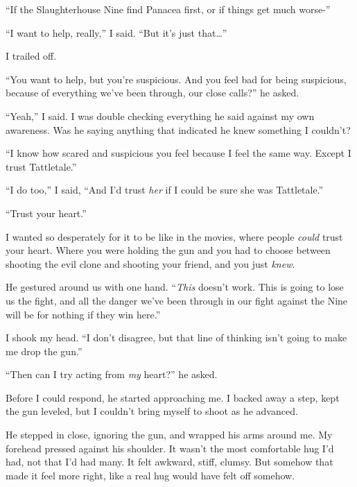 ``If the Slaughterhouse Nine find Panacea first, or if things get much worse-''



``I want to help, really,'' I said.  ``But it's just that\ldots''



I trailed off.



``You want to help, but you're suspicious.  And you feel bad for being suspicious, because of everything we've been through, our close calls?'' he asked.



``Yeah,'' I said.  I was double checking everything he said against my own awareness.  Was he saying anything that indicated he knew something I couldn't?



``I know how scared and suspicious you feel because I feel the same way.  Except I\emph{ }trust Tattletale.''



``I do too,'' I said, ``And I'd trust \emph{her} if I could be sure she was Tattletale.''



``Trust your heart.''



I wanted so desperately for it to be like in the movies, where people \emph{could} trust your heart.  Where you were holding the gun and you had to choose between shooting the evil clone and shooting your friend, and you just \emph{knew}.



He gestured around us with one hand. ``\emph{This} doesn't work.  This is going to lose us the fight, and all the danger we've been through in our fight against the Nine will be for nothing if they win here.''



I shook my head.  ``I don't disagree, but that line of thinking isn't going to make me drop the gun.''



``Then can I try acting from \emph{my} heart?''  he asked.



Before I could respond, he started approaching me.  I backed away a step, kept the gun leveled, but I couldn't bring myself to shoot as he advanced.



He stepped in close, ignoring the gun, and wrapped his arms around me.  My forehead pressed against his shoulder.  It wasn't the most comfortable hug I'd had, not that I'd had many.  It felt awkward, stiff, clumsy.  But somehow that made it feel more right, like a real hug would have felt off somehow.



